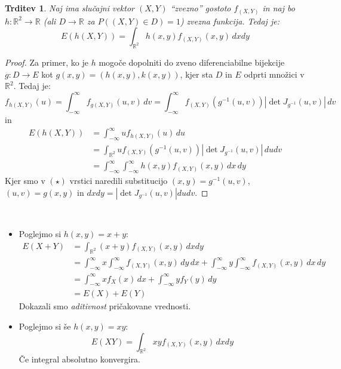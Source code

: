 \documentclass[12pt]{book}
\theoremstyle{definition}
\theoremstyle{plain}
\theoremstyle{plain}
\newtheorem{trditev}{Trditev}
\theoremstyle{plain}
\theoremstyle{plain}
\theoremstyle{remark}
\begin{document}
\begin{trditev}
    Naj ima slučajni vektor $(X, Y)$ “zvezno” gostoto $f_{(X, Y)}$ in naj bo $h: \mathbb{R}^2 \to \mathbb{R}$ (ali $D \to \mathbb{R}$ za $P((X, Y) \in D)=1$) zvezna funkcija. Tedaj je:
$$
E(h(X, Y))=\int_{\mathbb{R}^2} h(x, y) f_{(X, Y)}(x, y) \, d x d y
$$
\end{trditev}

\begin{proof}
    Za primer, ko je $h$ mogoče dopolniti do zveno diferenciabilne bijekcije $g: D \to E$ kot $g(x, y)=(h(x, y), k(x, y))$, kjer sta $D$ in $E$ odprti množici v $\mathbb{R}^2$. Tedaj je:
    $$
    f_{h(X, Y)}(u)=\int_{-\infty}^{\infty} f_{g(X, Y)}(u, v) \, d v=\int_{-\infty}^{\infty} f_{(X, Y)}\left(g^{-1}(u, v)\right)  \left| \det J_{g^{-1}}(u, v) \right| \, d v
    $$
    in
    \begin{align*}
        E(h(X, Y))&=\int_{-\infty}^{\infty} u f_{h(X, Y)}(u) \, d u \\
        &=\int_{\mathbb{R}^2} u f_{(X, Y)}\left(g^{-1}(u, v)\right)\left| \det J_{g^{-1}}(u, v)\right| \, d u d v \tag{$\star$} \\
        &=\int_{-\infty}^{\infty} \int_{-\infty}^{\infty} h(x, y) f_{(X, Y)}(x, y) \, d x \,  d y    
    \end{align*}
    Kjer smo v $(\star)$ vrstici naredili substitucijo $(x, y)=g^{-1}(u, v)$, $(u,v) = g(x,y)$ in $d x d y=\left|\det J_{g^{-1}}(u, v)\right| d u d v$.
\end{proof}

\begin{zgled}
    ~

    \begin{itemize}
        \item Poglejmo si $h(x, y)=x+y$:
        $$
        \begin{aligned}
            E(X+Y)&=\int_{\mathbb{R}^2}(x+y) f_{(X, Y)}(x, y) \, d x d y \\
            &=\int_{-\infty}^{\infty} x \int_{-\infty}^{\infty} f_{(X, Y)}(x, y) \, d y \, d x+\int_{-\infty}^{\infty} y \int_{-\infty}^{\infty} f_{(X, Y)}(x, y) \, d x \, d y \\
            &=\int_{-\infty}^{\infty} x f_X(x) \, d x+\int_{-\infty}^{\infty} y f_Y(y) \, d y \\
            &=E(X)+E(Y)
        \end{aligned}
        $$
        Dokazali smo \emph{aditivnost} pričakovane vrednosti.
        \item Poglejmo si še $h(x, y)=x y$:
        $$
        E(X Y)=\int_{\mathbb{R}^2} xy f_{(X, Y)}(x, y) \,d x d y
        $$
        Če integral absolutno konvergira. 
    \end{itemize}
\end{zgled}
\end{document}

